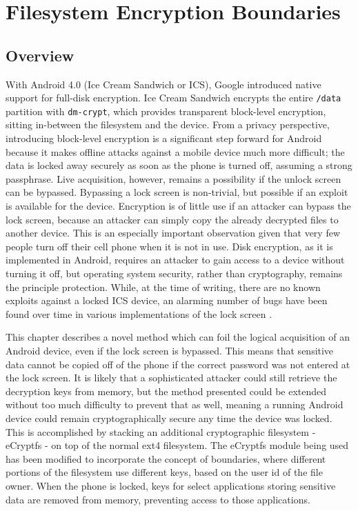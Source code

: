 \chapter{Filesystem Encryption Boundaries}
\label{ch:ecryptfs}

\section{Overview} 
With Android 4.0 (Ice Cream Sandwich or ICS), Google introduced native support for full-disk encryption. Ice Cream Sandwich encrypts
the entire \texttt{/data} partition with \texttt{dm-crypt}, which provides transparent block-level encryption, sitting in-between
the filesystem and the device. From a privacy perspective, introducing block-level encryption is a significant step forward for
Android because it makes offline attacks against a mobile device much more difficult; the data is locked away securely as soon as
the phone is turned off, assuming a strong passphrase. Live acquisition, however, remains a possibility if the unlock screen can be
bypassed.  Bypassing a lock screen is non-trivial, but possible if an exploit is available for the device. Encryption is of little
use if an attacker can bypass the lock screen, because an attacker can simply copy the already decrypted files to another device.
This is an especially important observation given that very few people turn off their cell phone when it is not in use. Disk
encryption, as it is implemented in Android, requires an attacker to gain access to a device without turning it off, but operating
system security, rather than cryptography, remains the principle protection. While, at the time of writing, there are no known
exploits against a locked ICS device, an alarming number of bugs have been found over time in various implementations of the lock
screen \cite{hoog, lockscreenbypass0, lockscreenbypass1, lockscreenbypass2}.

This chapter describes a novel method which can foil the logical acquisition of an Android device, even if the lock screen is
bypassed. This means that sensitive data cannot be copied off of the phone if the correct password was not entered at the lock
screen. It is likely that a sophisticated attacker could still retrieve the decryption keys from memory, but the method presented
could be extended without too much difficulty to prevent that as well, meaning a running Android device could remain
cryptographically secure any time the device was locked. This is accomplished by stacking an additional cryptographic filesystem -
eCryptfs - on top of the normal ext4 filesystem. The eCryptfs module being used has been modified to incorporate the concept of
boundaries, where different portions of the filesystem use different keys, based on the user id of the file owner. When the phone
is locked, keys for select applications storing sensitive data are removed from memory, preventing access to those applications.

